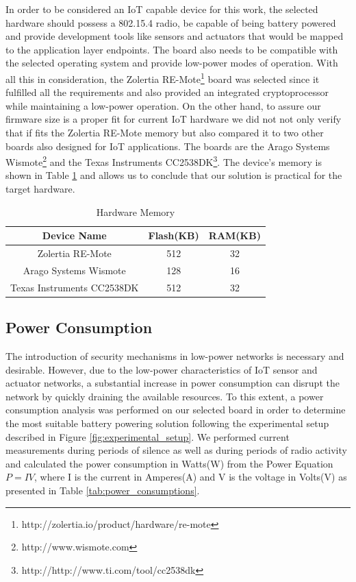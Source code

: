 In order to be considered an \gls{IoT} capable device for this work, the selected hardware should possess a 802.15.4 radio, be capable of being battery powered and provide development tools like sensors and actuators that would be mapped to the application layer endpoints. 
The board also needs to be compatible with the selected operating system and provide low-power modes of operation. 
With all this in consideration, the Zolertia RE-Mote\footnote{http://zolertia.io/product/hardware/re-mote} board was selected since it fulfilled all the requirements and also provided an integrated cryptoprocessor while maintaining a low-power operation.
On the other hand, to assure our firmware size is a proper fit for current \gls{IoT} hardware we did not not only verify that if fits the Zolertia RE-Mote memory but also compared it to two other boards also designed for \gls{IoT} applications. 
The boards are the Arago Systems Wismote\footnote{http://www.wismote.com} and the Texas Instruments CC2538DK\footnote{http://http://www.ti.com/tool/cc2538dk}. 
The device's memory is shown in Table \ref{tab:hardware_memory} and allows us to conclude that our solution is practical for the target hardware.

\begin{table}
\centering
\caption{Hardware Memory}
\label{tab:hardware_memory}
\begin{tabular}{|c|c|c|} \hline
Device Name&Flash(KB)&RAM(KB)\\ \hline
Zolertia RE-Mote& 512& 32\\ \hline
Arago Systems Wismote& 128& 16\\ \hline
Texas Instruments CC2538DK& 512 & 32\\
\hline\end{tabular}
\end{table}

\subsection{Power Consumption}
The introduction of security mechanisms in low-power networks is necessary and desirable. However, due to the low-power characteristics of \gls{IoT} sensor and actuator networks, a substantial increase in power consumption can disrupt the network by quickly draining the available resources. 
To this extent, a power consumption analysis was performed on our selected board in order to determine the most suitable battery powering solution following the experimental setup described in Figure \ref{fig:experimental_setup}. 
We performed current measurements during periods of silence as well as during periods of radio activity and calculated the power consumption in Watts(W) from the Power Equation $P = I  V$, where I is the current in Amperes(A) and V is the voltage in Volts(V) as presented in Table \ref{tab:power_consumptions}.

